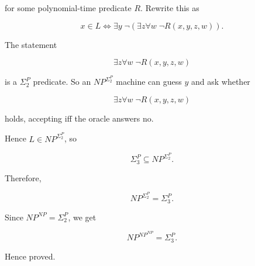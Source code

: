 \documentclass[11pt]{article}
\begin{document}
for some polynomial-time predicate $R$. Rewrite this as

\[
x \in L \iff \exists y \; \neg(\exists z \forall w \; \neg R(x,y,z,w)).
\]

The statement

\[
\exists z \forall w \; \neg R(x,y,z,w)
\]

is a $\Sigma_2^P$ predicate. So an $NP^{\Sigma_2^P}$ machine can guess $y$ and ask whether

\[
\exists z \forall w \; \neg R(x,y,z,w)
\]

holds, accepting iff the oracle answers no.

Hence $L \in NP^{\Sigma_2^P}$, so

\[
\Sigma_3^P \subseteq NP^{\Sigma_2^P}.
\]

Therefore,

\[
NP^{\Sigma_2^P} = \Sigma_3^P.
\]

Since $NP^{NP} = \Sigma_2^P$, we get

\[
NP^{NP^{NP}} = \Sigma_3^P.
\]

Hence proved.
\end{document}

